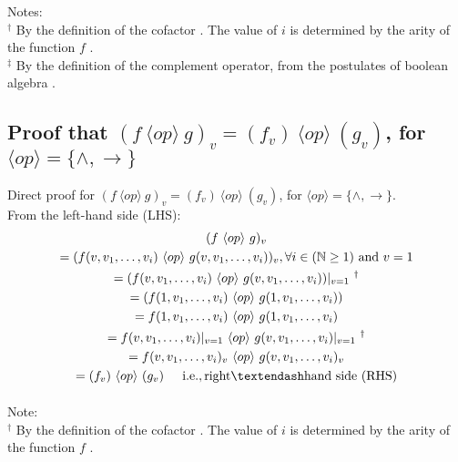 \documentclass[letter,12pt]{article}
\begin{document}
Notes: \\
$^{\dagger}$ By the definition of the cofactor \cite[\S2.5.1, pp. 69, Definition 2.5.1]{DeMicheli1994}. The value of $i$ is determined by the arity of the function $f$ \cite[\S4.1, pp. 118, NL2]{Tourlakis2008}. \\
$^{\ddagger}$ By the definition of the complement operator, from the postulates of boolean algebra \cite[\S3.1, pp. 30]{Brown1990}.




\subsection{Proof that $(f\ \langle op \rangle\ g)_{v} = (f_{v})\ \langle op \rangle\ (g_{v})$, for $\langle op \rangle = \{\land, \rightarrow\}$}
\label{ssec:commutativityofnegation}


Direct proof for $(f\ \langle op \rangle\ g)_{v} = (f_{v})\ \langle op \rangle\ (g_{v})$, for $\langle op \rangle = \{\land, \rightarrow\}$. \\

From the left-hand side (LHS):
\begin{eqnarray*}
	\begin{gathered}[b]
	(f\ \langle op \rangle\ g)_{v} \\
	= (f(v, v_{1}, \dots, v_{i})\ \langle op \rangle\ g(v, v_{1}, \dots, v_{i}))_{v}, \forall i \in (\mathbb{N} \geq 1) {\rm\ and}\ v = 1 \\
	= (f(v, v_{1}, \dots, v_{i}) \ \langle op \rangle\ g(v, v_{1}, \dots, v_{i})) |_{v = 1}\ ^{\dagger} \\
	= (f(1, v_{1}, \dots, v_{i}) \ \langle op \rangle\ g(1, v_{1}, \dots, v_{i})) \\
	= f(1, v_{1}, \dots, v_{i}) \ \langle op \rangle\ g(1, v_{1}, \dots, v_{i}) \\
	= f(v, v_{1}, \dots, v_{i})|_{v = 1} \ \langle op \rangle\ g(v, v_{1}, \dots, v_{i})|_{v = 1}\ ^{\dagger} \\
	= f(v, v_{1}, \dots, v_{i})_{v} \ \langle op \rangle\ g(v, v_{1}, \dots, v_{i})_{v} \\
	= (f_{v})\ \langle op \rangle\ (g_{v}) {\rm \hspace{0.2in} i.e., right\textendash hand\ side\ (RHS)} \\
	\end{gathered}
\end{eqnarray*}

Note: \\
$^{\dagger}$ By the definition of the cofactor \cite[\S2.5.1, pp. 69, Definition 2.5.1]{DeMicheli1994}. The value of $i$ is determined by the arity of the function $f$ \cite[\S4.1, pp. 118, NL2]{Tourlakis2008}. \\
\end{document}
